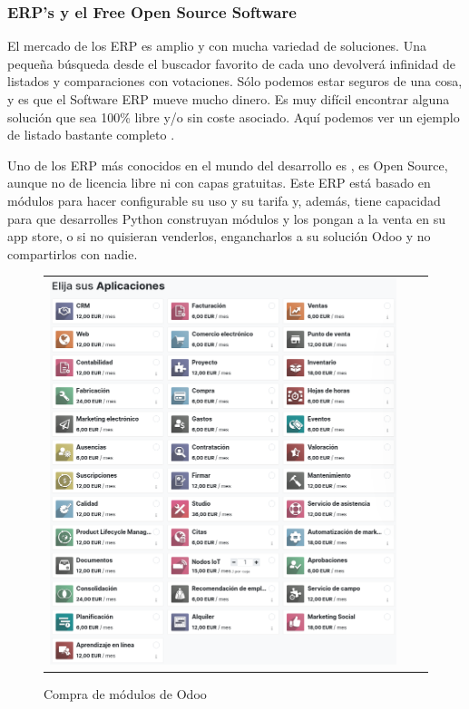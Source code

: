 \subsubsection{ERP's y el Free Open Source Software}
El mercado de los ERP es amplio y con mucha variedad de soluciones. Una pequeña búsqueda desde el buscador favorito de cada uno devolverá infinidad de listados y comparaciones con votaciones. Sólo podemos estar seguros de una cosa, y es que el Software ERP mueve mucho dinero. Es muy difícil encontrar alguna solución que sea 100\% libre y/o sin coste asociado. Aquí podemos ver un ejemplo de listado bastante completo \citep{15FreeERP}.
\vspace{1em}
\par Uno de los ERP más conocidos en el mundo del desarrollo es \citep{odooWebpage}, es Open Source, aunque no de licencia libre ni con capas gratuitas. Este ERP está basado en módulos para hacer configurable su uso y su tarifa y, además, tiene capacidad para que desarrolles Python construyan módulos y los pongan a la venta en su app store, o si no quisieran venderlos, engancharlos a su solución Odoo y no compartirlos con nadie.
\begin{figure}[h]
\centering
\begin{tabular}{ccc}
\includegraphics[scale=0.4]{archivos/odooModules.png}
\end{tabular}
\caption{Compra de módulos de Odoo}
\label{fig:odooModules}
\end{figure}
